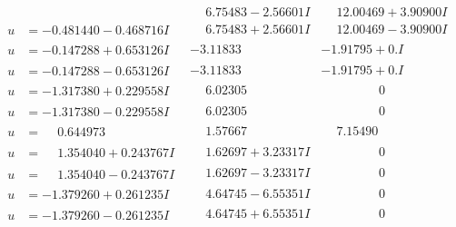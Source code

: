 \documentclass[1p]{elsarticle_modified}
\theoremstyle{definition}
\begin{document}
$$\begin{array}{c|c|c}
 & \phantom{-}6.75483 - 2.56601 I & \phantom{-}12.00469 + 3.90900 I \\ \hline\begin{aligned}
u &= -0.481440 - 0.468716 I\end{aligned}
 & \phantom{-}6.75483 + 2.56601 I & \phantom{-}12.00469 - 3.90900 I \\ \hline\begin{aligned}
u &= -0.147288 + 0.653126 I\end{aligned}
 & -3.11833\phantom{ +0.000000I} & -1.91795 + 0. I\phantom{ +0.000000I} \\ \hline\begin{aligned}
u &= -0.147288 - 0.653126 I\end{aligned}
 & -3.11833\phantom{ +0.000000I} & -1.91795 + 0. I\phantom{ +0.000000I} \\ \hline\begin{aligned}
u &= -1.317380 + 0.229558 I\end{aligned}
 & \phantom{-}6.02305\phantom{ +0.000000I} & \phantom{-0.000000 } 0 \\ \hline\begin{aligned}
u &= -1.317380 - 0.229558 I\end{aligned}
 & \phantom{-}6.02305\phantom{ +0.000000I} & \phantom{-0.000000 } 0 \\ \hline\begin{aligned}
u &= \phantom{-}0.644973\phantom{ +0.000000I}\end{aligned}
 & \phantom{-}1.57667\phantom{ +0.000000I} & \phantom{-}7.15490\phantom{ +0.000000I} \\ \hline\begin{aligned}
u &= \phantom{-}1.354040 + 0.243767 I\end{aligned}
 & \phantom{-}1.62697 + 3.23317 I & \phantom{-0.000000 } 0 \\ \hline\begin{aligned}
u &= \phantom{-}1.354040 - 0.243767 I\end{aligned}
 & \phantom{-}1.62697 - 3.23317 I & \phantom{-0.000000 } 0 \\ \hline\begin{aligned}
u &= -1.379260 + 0.261235 I\end{aligned}
 & \phantom{-}4.64745 - 6.55351 I & \phantom{-0.000000 } 0 \\ \hline\begin{aligned}
u &= -1.379260 - 0.261235 I\end{aligned}
 & \phantom{-}4.64745 + 6.55351 I & \phantom{-0.000000 } 0\\

\end{array}$$
\end{document}

